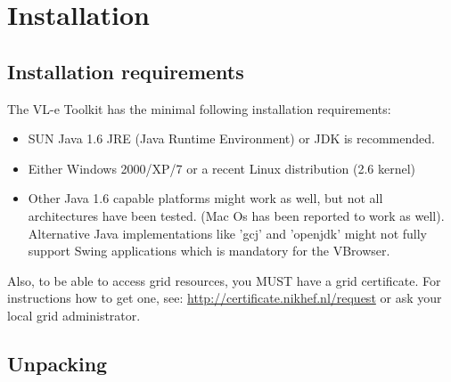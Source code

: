 %
%


\chapter{Installation}
\label{chap:vlet_installation}

\section{Installation requirements}

The VL-e Toolkit has the minimal following installation requirements:
\begin{itemize}  
   \item SUN Java 1.6 JRE (Java Runtime Environment) or JDK is recommended.   
   \item Either Windows 2000/XP/7 or a recent Linux distribution (2.6 kernel)
   \item Other Java 1.6 capable platforms might work as well, but not all
   architectures have been tested. (Mac Os has been reported to work as well).\\
   Alternative Java implementations like 'gcj'  and 'openjdk' might not fully
   support Swing applications which is mandatory for the VBrowser. 
 \end{itemize} 

Also, to be able to access grid resources, you MUST have a grid certificate. 
For instructions how to get one, see:
\url{http://certificate.nikhef.nl/request} or ask your local grid administrator. 

\section{Unpacking}

